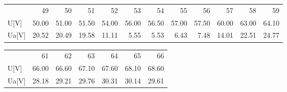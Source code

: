 \documentclass[a4paper,10pt]{article}
\begin{document}
\begin{figure}[H]
\begin{tabular}{lrrrrrrrrrrr}

{} &     49 &     50 &     51 &     52 &     53 &     54 &     55 &     56 &     57 &     58 &     59 \\

U[V]  &  50.00 &  51.00 &  51.50 &  54.00 &  56.00 &  56.50 &  57.00 &  57.50 &  60.00 &  63.00 &  64.10 \\
Ua[V] &  20.52 &  20.49 &  19.58 &  11.11 &   5.55 &   5.53 &   6.43 &   7.48 &  14.01 &  22.51 &  24.77 \\

\end{tabular}
\end{figure}

\begin{figure}[H]
\begin{tabular}{lrrrrrr}

{} &     61 &     62 &     63 &     64 &     65 &     66 \\

U[V]  &  66.00 &  66.60 &  67.10 &  67.60 &  68.10 &  68.60 \\
Ua[V] &  28.18 &  29.21 &  29.76 &  30.31 &  30.14 &  29.61 \\

\end{tabular}
\end{figure}
\end{document}
